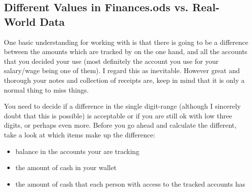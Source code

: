 \subsection{Different Values in Finances.ods vs. Real-World Data}
\label{subsec:different-values-finances.ods-vs-real-world}

One basic understanding for working with \tfn is that there is going to be a difference between the amounts which are tracked by \tfn on the one hand, and all the accounts that you decided your use (most definitely the account you use for your salary/wage being one of them).
I regard this as inevitable.
However great and thorough your notes and collection of receipts are, keep in mind that it is only a normal thing to miss things.

You need to decide if a difference in the single digit-range (although I sincerely doubt that this is possible) is acceptable or if you are still ok with low three digits, or perhaps even more.
Before you go ahead and calculate the different, take a look at which items make up the difference:
\begin{itemize}
	\item balance in the accounts your are tracking
	\item the amount of cash in your wallet
	\item the amount of cash that each person with access to the tracked accounts has
\end{itemize}